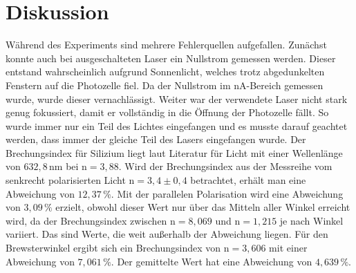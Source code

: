 \section{Diskussion}
\label{sec:Diskussion}

Während des Experiments sind mehrere Fehlerquellen aufgefallen. Zunächst konnte auch bei ausgeschalteten Laser ein Nullstrom gemessen werden. Dieser entstand wahrscheinlich aufgrund Sonnenlicht, welches trotz abgedunkelten Fenstern auf die Photozelle fiel.
Da der Nullstrom im $\unit{\nano \ampere}$-Bereich gemessen wurde, wurde dieser vernachlässigt.
Weiter war der verwendete Laser nicht stark genug fokussiert, damit er vollständig in die Öffnung der Photozelle fällt. 
So wurde immer nur ein Teil des Lichtes eingefangen und es musste darauf geachtet werden, dass immer der gleiche Teil des Lasers eingefangen wurde.
Der Brechungsindex für Silizium liegt laut Literatur \cite{ap02} für Licht mit einer Wellenlänge von $ 632,8 \, \unit{\nano\meter}$ bei $ \text{n} = 3,88 $.
Wird der Brechungsindex aus der Messreihe vom senkrecht polarisierten Licht $ \text{n} = 3,4 \pm 0,4 $ betrachtet, erhält man eine Abweichung von $ 12,37 \,\%$.
Mit der parallelen Polarisation wird eine Abweichung von $ 3,09 \,\%$ erzielt, 
obwohl dieser Wert nur über das Mitteln aller Winkel erreicht wird, da der Brechungsindex zwischen $ \text{n} = 8,069 $ und  $ \text{n} = 1,215 $ je nach Winkel variiert.
Das sind Werte, die weit außerhalb der Abweichung liegen.
Für den Brewsterwinkel ergibt sich ein Brechungsindex von $ \text{n} = 3,606 $ mit einer Abweichung von $ 7,061 \,\%$. Der gemittelte Wert hat eine Abweichung von $ 4,639 \,\%$.
